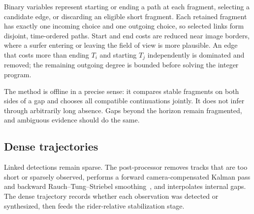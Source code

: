 Binary variables represent starting or ending a path at each fragment, selecting a
candidate edge, or discarding an eligible short fragment.  Each retained fragment has
exactly one incoming choice and one outgoing choice, so selected links form disjoint,
time-ordered paths.  Start and end costs are reduced near image borders, where a
surfer entering or leaving the field of view is more plausible.  An edge that costs
more than ending $T_i$ and starting $T_j$ independently is dominated and removed; the
remaining outgoing degree is bounded before solving the integer program.

The method is offline in a precise sense: it compares stable fragments on both sides
of a gap and chooses all compatible continuations jointly.  It does not infer through
arbitrarily long absence.  Gaps beyond the horizon remain fragmented, and ambiguous
evidence should do the same.

\subsection{Dense trajectories}

Linked detections remain sparse.  The post-processor removes tracks that are too short
or sparsely observed, performs a forward camera-compensated Kalman pass and backward
Rauch--Tung--Striebel smoothing~\cite{rts}, and interpolates internal gaps.  The dense
trajectory records whether each observation was detected or synthesized, then feeds
the rider-relative stabilization stage.
